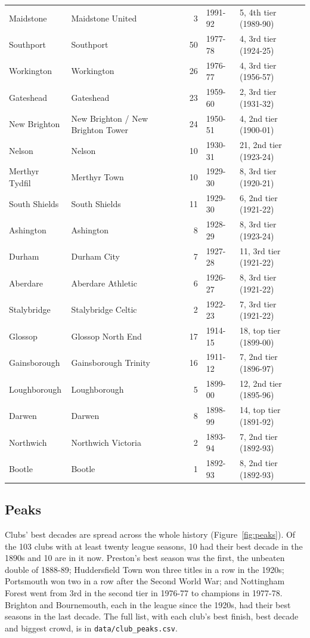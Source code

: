 \documentclass[11pt,a4paper]{article}
\begin{document}
\begin{table}[tbp]
\begin{tabular}{llrll}
Maidstone & Maidstone United & 3 & 1991-92 & 5, 4th tier (1989-90)\\
Southport & Southport & 50 & 1977-78 & 4, 3rd tier (1924-25)\\
Workington & Workington & 26 & 1976-77 & 4, 3rd tier (1956-57)\\
Gateshead & Gateshead & 23 & 1959-60 & 2, 3rd tier (1931-32)\\
New Brighton & New Brighton / New Brighton Tower & 24 & 1950-51 & 4, 2nd tier (1900-01)\\
Nelson & Nelson & 10 & 1930-31 & 21, 2nd tier (1923-24)\\
Merthyr Tydfil & Merthyr Town & 10 & 1929-30 & 8, 3rd tier (1920-21)\\
South Shields & South Shields & 11 & 1929-30 & 6, 2nd tier (1921-22)\\
Ashington & Ashington & 8 & 1928-29 & 8, 3rd tier (1923-24)\\
Durham & Durham City & 7 & 1927-28 & 11, 3rd tier (1921-22)\\
Aberdare & Aberdare Athletic & 6 & 1926-27 & 8, 3rd tier (1921-22)\\
Stalybridge & Stalybridge Celtic & 2 & 1922-23 & 7, 3rd tier (1921-22)\\
Glossop & Glossop North End & 17 & 1914-15 & 18, top tier (1899-00)\\
Gainsborough & Gainsborough Trinity & 16 & 1911-12 & 7, 2nd tier (1896-97)\\
Loughborough & Loughborough & 5 & 1899-00 & 12, 2nd tier (1895-96)\\
Darwen & Darwen & 8 & 1898-99 & 14, top tier (1891-92)\\
Northwich & Northwich Victoria & 2 & 1893-94 & 7, 2nd tier (1892-93)\\
Bootle & Bootle & 1 & 1892-93 & 8, 2nd tier (1892-93)\\
\bottomrule\end{tabular}\end{table}

\subsection{Peaks}
Clubs' best decades are spread across the whole history (Figure~\ref{fig:peaks}). Of the 103 clubs with at least twenty league seasons, 10 had their best decade in the 1890s and 10 are in it now. Preston's best season was the first, the unbeaten double of 1888-89; Huddersfield Town won three titles in a row in the 1920s; Portsmouth won two in a row after the Second World War; and Nottingham Forest went from 3rd in the second tier in 1976-77 to champions in 1977-78. Brighton and Bournemouth, each in the league since the 1920s, had their best seasons in the last decade. The full list, with each club's best finish, best decade and biggest crowd, is in \texttt{data/club\_peaks.csv}.
\end{document}
